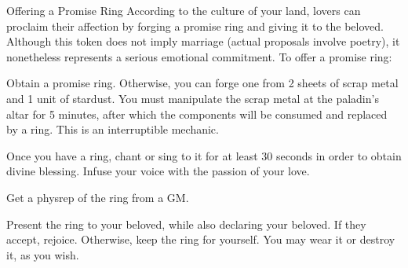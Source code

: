 \documentclass[green]{guildcamp3}
\begin{document}
\name{\gTest{}}
   \name{\gRing{}}
    Offering a Promise Ring
    According to the culture of your land, lovers can proclaim their affection by forging a promise ring and giving it to the beloved. Although this token does not imply marriage (actual proposals involve poetry), it nonetheless represents a serious emotional commitment.
    To offer a promise ring:
\begin{enum}[Directions]
      \item Obtain a promise ring. Otherwise, you can forge one from 2 sheets of scrap metal and 1 unit of stardust. You must manipulate the scrap metal at the paladin's altar for 5 minutes, after which the components will be consumed and replaced by a ring. This is an interruptible mechanic.
\item Once you have a ring, chant or sing to it for at least 30 seconds in order to obtain divine blessing. Infuse your voice with the passion of your love.
\item Get a physrep of the ring from a GM.
\item Present the ring to your beloved, while also declaring your beloved. If they accept, rejoice. Otherwise, keep the ring for yourself. You may wear it or destroy it, as you wish.
       \end{enum}
\end{document}

